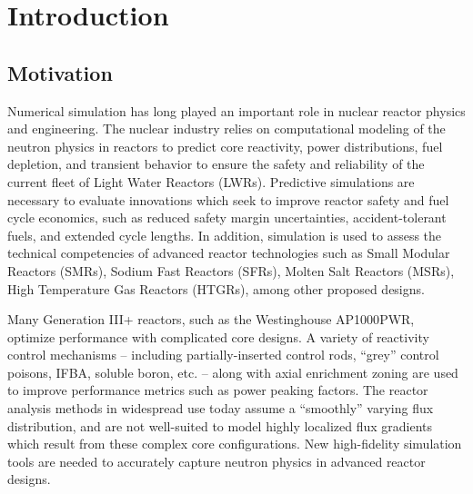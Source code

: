 \chapter{Introduction}
\label{chap:intro}

\section{Motivation}
\label{sec:chap1-motivation}


Numerical simulation has long played an important role in nuclear reactor physics and engineering. The nuclear industry relies on computational modeling of the neutron physics in reactors to predict core reactivity, power distributions, fuel depletion, and transient behavior to ensure the safety and reliability of the current fleet of Light Water Reactors (LWRs). Predictive simulations are necessary to evaluate innovations which seek to improve reactor safety and fuel cycle economics, such as reduced safety margin uncertainties, accident-tolerant fuels, and extended cycle lengths. In addition, simulation is used to assess the technical competencies of advanced reactor technologies such as Small Modular Reactors (SMRs), Sodium Fast Reactors (SFRs), Molten Salt Reactors (MSRs), High Temperature Gas Reactors (HTGRs), among other proposed designs. 

Many Generation III+ reactors, such as the Westinghouse AP1000\texttrademark \ac{PWR}, optimize performance with complicated core designs. A variety of reactivity control mechanisms -- including partially-inserted control rods, ``grey'' control poisons, \ac{IFBA}, soluble boron, etc. -- along with axial enrichment zoning are used to improve performance metrics such as power peaking factors. The reactor analysis methods in widespread use today assume a ``smoothly'' varying flux distribution, and are not well-suited to model highly localized flux gradients which result from these complex core configurations. New high-fidelity simulation tools are needed to accurately capture neutron physics in advanced reactor designs.

